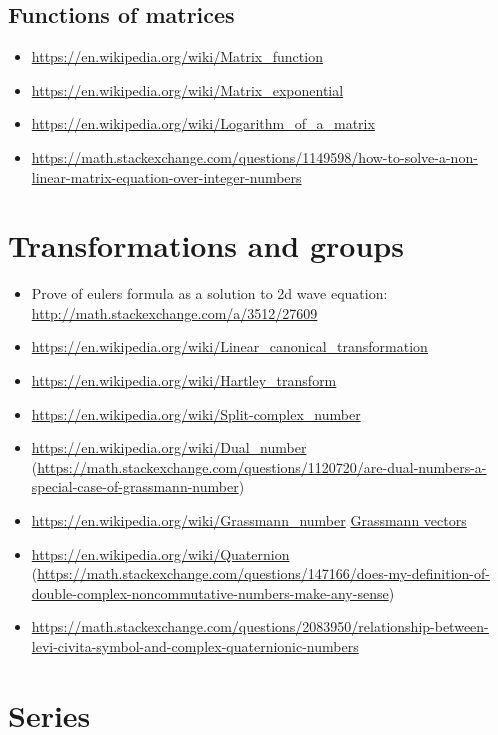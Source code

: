 \subsection{Functions of matrices}
\begin{itemize}
\item \url{https://en.wikipedia.org/wiki/Matrix_function}
\item \url{https://en.wikipedia.org/wiki/Matrix_exponential}
\item \url{https://en.wikipedia.org/wiki/Logarithm_of_a_matrix}
\item \url{https://math.stackexchange.com/questions/1149598/how-to-solve-a-non-linear-matrix-equation-over-integer-numbers}
\end{itemize}
\section{Transformations and groups}

\begin{itemize}
\item Prove of eulers formula as a solution to 2d wave equation: \url{http://math.stackexchange.com/a/3512/27609}
\item \url{https://en.wikipedia.org/wiki/Linear_canonical_transformation}
\item \url{https://en.wikipedia.org/wiki/Hartley_transform}
\item \url{https://en.wikipedia.org/wiki/Split-complex_number}
\item \url{https://en.wikipedia.org/wiki/Dual_number} (\url{https://math.stackexchange.com/questions/1120720/are-dual-numbers-a-special-case-of-grassmann-number})
\item \url{https://en.wikipedia.org/wiki/Grassmann_number} \href{https://math.stackexchange.com/questions/1108045/relationship-between-levi-civita-symbol-and-grassmann-numbers}{Grassmann vectors}
\item \url{https://en.wikipedia.org/wiki/Quaternion} (\url{https://math.stackexchange.com/questions/147166/does-my-definition-of-double-complex-noncommutative-numbers-make-any-sense})
\item \url{https://math.stackexchange.com/questions/2083950/relationship-between-levi-civita-symbol-and-complex-quaternionic-numbers}
\end{itemize}
\section{Series}

